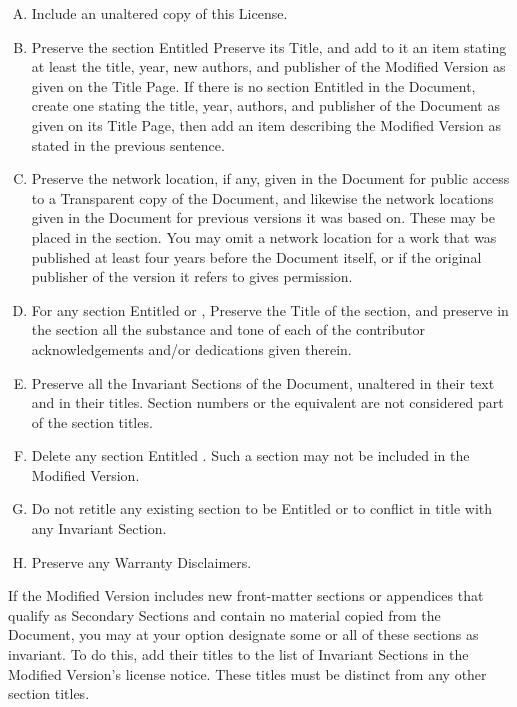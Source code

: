 \begin{enumerate}[A.]
\item    Include an unaltered copy of this License.

\item    Preserve the section Entitled  Preserve
its Title, and add to it an item stating at least the title,
year, new authors, and publisher of the Modified Version
as given on the Title Page. If there is no section Entitled
 in the Document, create one stating the title,
year, authors, and publisher of the Document as given on its
Title Page, then add an item describing the Modified Version
as stated in the previous sentence.

\item    Preserve the network location, if any, given in
the Document for public access to a Transparent copy of the
Document, and likewise the network locations given in the
Document for previous versions it was based on. These may be
placed in the  section. You may omit a network
location for a work that was published at least four years
before the Document itself, or if the original publisher of
the version it refers to gives permission.

\item For any section Entitled 
or , Preserve the Title of the section,
and preserve in the section all the substance and tone of
each of the contributor acknowledgements and/or dedications
given therein.

\item    Preserve all the Invariant Sections of the Document,
unaltered in their text and in their titles. Section numbers or
the equivalent are not considered part of the section titles.

\item    Delete any section Entitled . Such
a section may not be included in the Modified Version.

\item    Do not retitle any existing section to be Entitled
 or to conflict in title with any Invariant
Section.

\item    Preserve any Warranty Disclaimers. 
\end{enumerate}

If the Modified Version includes new front-matter sections
or appendices that qualify as Secondary Sections and contain
no material copied from the Document, you may at your option
designate some or all of these sections as invariant. To do
this, add their titles to the list of Invariant Sections in
the Modified Version\textquoteright s license notice. These titles must
be distinct from any other section titles.

